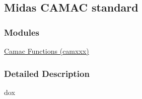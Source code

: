 \subsection{Midas CAMAC standard}
\label{group__mcstdinclude}
\subsubsection*{Modules}
\begin{DoxyCompactItemize}
\item 
\hyperlink{group__mcstdfunctionh}{Camac Functions (camxxx)}
\end{DoxyCompactItemize}


\subsubsection{Detailed Description}
dox 